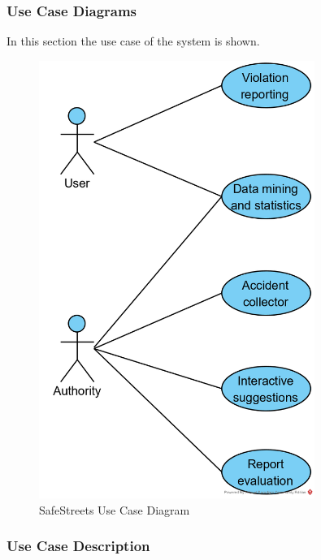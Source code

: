 \documentclass{article}
\begin{document}
			\subsubsection{Use Case Diagrams}
				In this section the use case of the system is shown.
				\begin{figure}[H]
					\centering
					\includegraphics[width=0.8\textwidth]{diagrams/usecase_safestreets.png}
					\caption[SafeStreets use case diagram]{SafeStreets Use Case Diagram}
					\label{fig:usecase_safestreets}
				\end{figure}
			
			\clearpage
			\subsubsection{Use Case Description}
				
\end{document}
